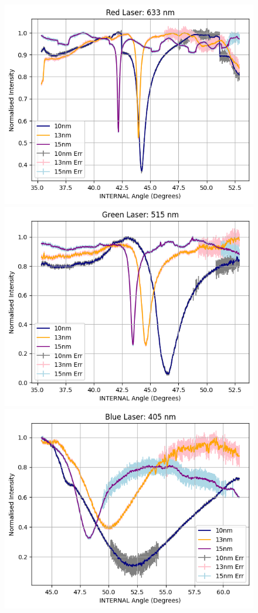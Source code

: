 \documentclass[%
reprint,
amsmath,amssymb,
aps,
]{revtex4-2}
\begin{document}
		\begin{figure}[h]
			\includegraphics[width=0.85\columnwidth]{redThicknessVariation.png}
			\includegraphics[width=0.85\columnwidth]{greenThicknessVariation.png}
			\includegraphics[width=0.85\columnwidth]{blueThicknessVariation.png}

\end{figure}
\end{document}

